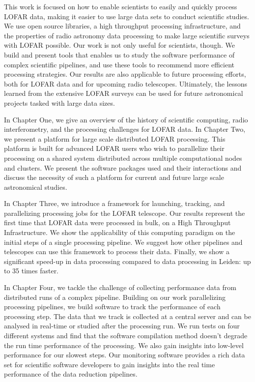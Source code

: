 This work is focused on how to enable scientists to easily and quickly process LOFAR data, making it easier to use large data sets to conduct scientific studies. We use open source libraries, a high throughput processing infrastructure, and the properties of radio astronomy data processing to make large scientific surveys with LOFAR possible. Our work is not only useful for scientists, though. We build and present tools that enables us to study the software performance of complex scientific pipelines, and use these tools to recommend more efficient processing strategies. Our results are also applicable to future processing efforts, both for LOFAR data and for upcoming radio telescopes. Ultimately, the lessons learned from the extensive LOFAR surveys can be used for future astronomical projects tasked with large data sizes.

In Chapter One, we give an overview of the history of scientific computing, radio interferometry, and the processing challenges for LOFAR data. In Chapter Two, we present a platform for large scale distributed LOFAR processing. This platform is built for advanced LOFAR users who wish to parallelize their processing on a shared system distributed across multiple computational nodes and clusters. We present the software packages used and their interactions and discuss the necessity of such a platform for current and future large scale astronomical studies. 

In Chapter Three, we introduce a framework for launching, tracking, and parallelizing processing jobs for the LOFAR telescope. Our results represent the first time that LOFAR data were processed in bulk, on a High Throughput Infrastructure. We show the applicability of this computing paradigm on the initial steps of a single processing pipeline. We suggest how other pipelines and telescopes can use this framework to process their data.  Finally, we show a significant speed-up in data processing compared to data processing in Leiden: up to 35 times faster.

In Chapter Four, we tackle the challenge of collecting performance data from distributed runs of a complex pipeline. Building on our work parallelizing processing pipelines, we build software to track the performance of each processing step. The data that we track is collected at a central server and can be analysed in real-time or studied after the processing run. We run tests on four different systems and find that the software compilation method doesn't degrade the run time performance of the processing.  We also gain insights into low-level performance for our slowest steps. Our monitoring software provides a rich data set for scientific software developers to gain insights into the real time performance of the data reduction pipelines.  

